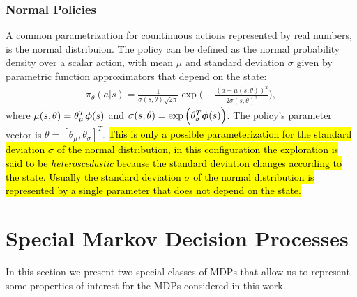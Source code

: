 \subsubsection{Normal Policies}
A common parametrization for countinuous actions represented by real numbers, is the normal distribuion. The policy can be defined as the normal probability density over a scalar action, with mean $\mu$ and standard deviation $\sigma$ given by parametric function approximators that depend on the state:
\begin{align} \pi_{\theta}(a|s) = \frac{1}{\sigma(s, \theta)\sqrt{2\pi}}\exp\Big( -\frac{(a -\mu(s, \theta))^2}{2\sigma(s, \theta)^2}\Big), \end{align} 
where $\mu(s, \theta) = \theta_{\mu}^{T} \boldsymbol{\phi}(s)$ and $\sigma(s, \theta) = \exp\Big( \theta_{\sigma}^{T}\boldsymbol{\phi}(s) \Big)$. The policy's parameter vector is $\theta = [\theta_{\mu}, \theta_{\sigma}]^{T}$. \hl{This is only a possible parameterization for the standard deviation $\sigma$ of the normal distribution, in this configuration the exploration is said to be \emph{heteroscedastic} because the standard deviation changes according to the state. Usually the standard deviation $\sigma$ of the normal distribution is represented by a single parameter that does not depend on the state.} 

\section{Special Markov Decision Processes} \label{sec:specmdp}
In this section we present two special classes of \ac{MDPs} that allow us to represent some properties of interest for the \ac{MDPs} considered in this work.

